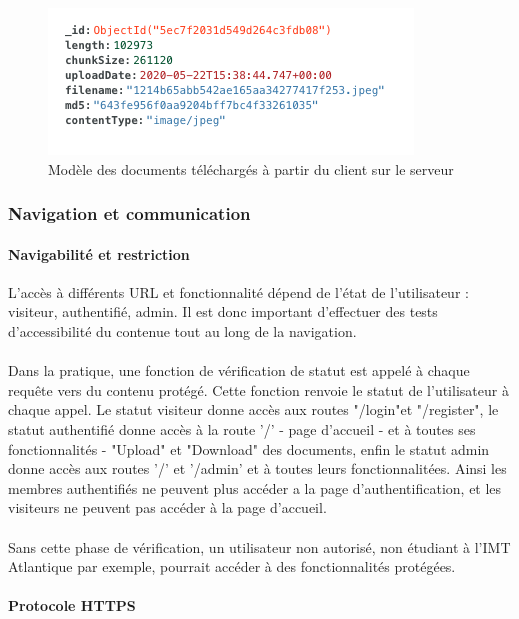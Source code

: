 \documentclass[oneside,a4paper,13pt]{article}
\begin{document}
\begin{figure}[H]
    \centering
        \includegraphics[width=0.5\linewidth]{Backend/Database/documents schema.png}
        \caption{Modèle des documents téléchargés à partir du client sur le serveur}
        \label{fig:my_label}
\end{figure}


\subsubsection{Navigation et communication}

\paragraph{Navigabilité et restriction}

L'accès à différents URL et fonctionnalité dépend de l'état de l'utilisateur : visiteur, authentifié, admin. Il est donc important d'effectuer des tests d'accessibilité du contenue tout au long de la navigation. \\ \\
Dans la pratique, une fonction de vérification de statut est appelé à chaque requête vers du contenu protégé. Cette fonction renvoie le statut de l'utilisateur à chaque appel. Le statut visiteur donne accès aux routes "/login"et "/register", le statut authentifié donne accès à la route '/' - page d'accueil - et à toutes ses fonctionnalités - "Upload" et "Download" des documents, enfin le statut admin donne accès aux routes '/' et '/admin' et à toutes leurs fonctionnalitées. Ainsi les membres authentifiés ne peuvent plus accéder a la page d'authentification, et les visiteurs ne peuvent pas accéder à la page d'accueil. \\ \\
Sans cette phase de vérification, un utilisateur non autorisé, non étudiant à l'IMT Atlantique par exemple,  pourrait accéder à des fonctionnalités protégées.

\paragraph{Protocole HTTPS}
\end{document}

